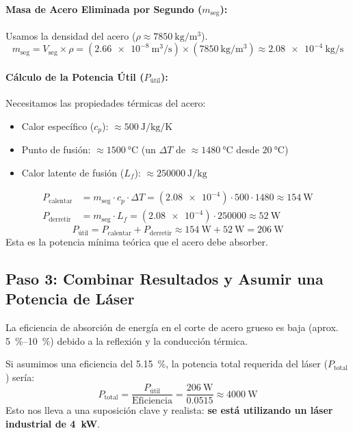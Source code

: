 \documentclass[11pt,a4paper]{book}
\begin{document}
\paragraph{Masa de Acero Eliminada por Segundo ($m_{\text{seg}}$):}
Usamos la densidad del acero ($\rho \approx \SI{7850}{\kilo\gram\per\meter^3}$).
\[ m_{\text{seg}} = V_{\text{seg}} \times \rho = (\SI{2.66e-8}{\meter^3\per\second}) \times (\SI{7850}{\kilo\gram\per\meter^3}) \approx \SI{2.08e-4}{\kilo\gram\per\second} \]

\paragraph{Cálculo de la Potencia Útil ($P_{\text{útil}}$):}
Necesitamos las propiedades térmicas del acero:
\begin{itemize}
    \item Calor específico ($c_p$): $\approx \SI{500}{\joule\per\kilo\gram\per\kelvin}$
    \item Punto de fusión: $\approx \SI{1500}{\celsius}$ (un $\Delta T$ de $\approx \SI{1480}{\celsius}$ desde $\SI{20}{\celsius}$)
    \item Calor latente de fusión ($L_f$): $\approx \SI{250000}{\joule\per\kilo\gram}$
\end{itemize}
\begin{align*}
    P_{\text{calentar}} &= m_{\text{seg}} \cdot c_p \cdot \Delta T = (\SI{2.08e-4}) \cdot 500 \cdot 1480 \approx \SI{154}{\watt} \\
    P_{\text{derretir}} &= m_{\text{seg}} \cdot L_f = (\SI{2.08e-4}) \cdot 250000 \approx \SI{52}{\watt}
\end{align*}
\[ P_{\text{útil}} = P_{\text{calentar}} + P_{\text{derretir}} \approx \SI{154}{\watt} + \SI{52}{\watt} = \SI{206}{\watt} \]
Esta es la potencia mínima teórica que el acero debe absorber.

\subsection*{Paso 3: Combinar Resultados y Asumir una Potencia de Láser}
La eficiencia de absorción de energía en el corte de acero grueso es baja (aprox. \SIrange{5}{10}{\percent}) debido a la reflexión y la conducción térmica.

Si asumimos una eficiencia del \SI{5.15}{\percent}, la potencia total requerida del láser ($P_{\text{total}}$) sería:
\[ P_{\text{total}} = \frac{P_{\text{útil}}}{\text{Eficiencia}} = \frac{\SI{206}{\watt}}{0.0515} \approx \SI{4000}{\watt} \]
Esto nos lleva a una suposición clave y realista: \textbf{se está utilizando un láser industrial de \SI{4}{kW}}.
\end{document}
